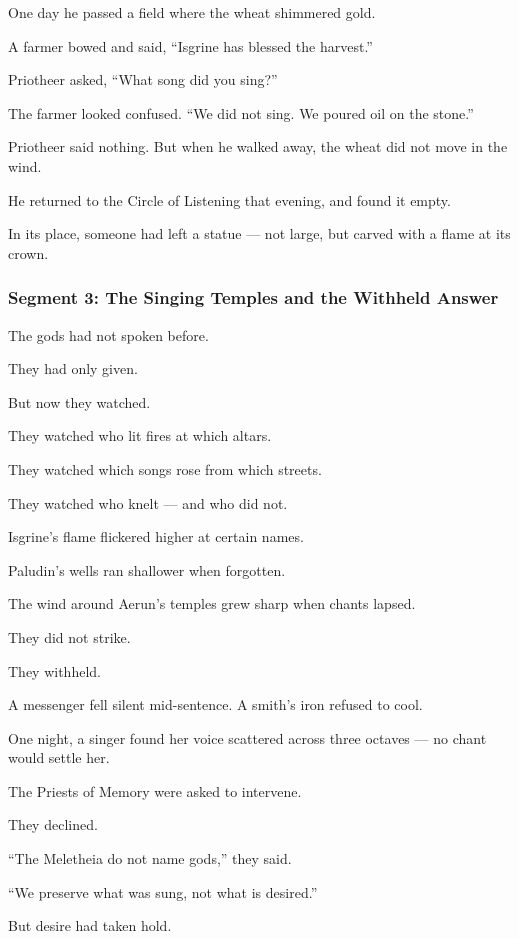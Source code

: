 \documentclass[9pt]{article}
\begin{document}
One day he passed a field where the wheat shimmered gold.  

A farmer bowed and said, “Isgrine has blessed the harvest.”

Priotheer asked,  
“What song did you sing?”

The farmer looked confused.  
“We did not sing. We poured oil on the stone.”

Priotheer said nothing.  
But when he walked away, the wheat did not move in the wind.

He returned to the Circle of Listening that evening, and found it empty.

In its place, someone had left a statue — not large,  
but carved with a flame at its crown.

\newpage

\subsubsection*{Segment 3: The Singing Temples and the Withheld Answer}

The gods had not spoken before.

They had only given.

But now they watched.

They watched who lit fires at which altars.  

They watched which songs rose from which streets.  

They watched who knelt — and who did not.

Isgrine’s flame flickered higher at certain names.  

Paludin’s wells ran shallower when forgotten. 

The wind around Aerun’s temples grew sharp when chants lapsed.

They did not strike.  

They withheld.

A messenger fell silent mid-sentence.  
A smith’s iron refused to cool.  

One night, a singer found her voice scattered across three octaves — no chant would settle her.

The Priests of Memory were asked to intervene. 

They declined.  

 “The Meletheia do not name gods,” they said. 
 
 “We preserve what was sung, not what is desired.”

But desire had taken hold.
\end{document}
